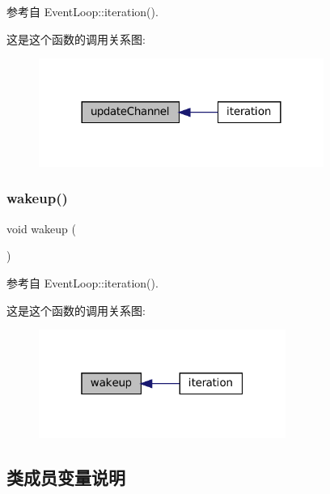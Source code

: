 参考自 Event\+Loop\+::iteration().

这是这个函数的调用关系图\+:
\nopagebreak
\begin{figure}[H]
\begin{center}
\leavevmode
\includegraphics[width=264pt]{classmuduo_1_1net_1_1EventLoop_acaa4a191936aacf608d279a6f343d533_icgraph}
\end{center}
\end{figure}
\mbox{\label{classmuduo_1_1net_1_1EventLoop_ae674290a26ecbd622c5160e38e8a4fe9}} 
\subsubsection{\texorpdfstring{wakeup()}{wakeup()}}
{\footnotesize\ttfamily void wakeup (\begin{DoxyParamCaption}{ }\end{DoxyParamCaption})}



参考自 Event\+Loop\+::iteration().

这是这个函数的调用关系图\+:
\nopagebreak
\begin{figure}[H]
\begin{center}
\leavevmode
\includegraphics[width=229pt]{classmuduo_1_1net_1_1EventLoop_ae674290a26ecbd622c5160e38e8a4fe9_icgraph}
\end{center}
\end{figure}


\subsection{类成员变量说明}
\mbox{\label{classmuduo_1_1net_1_1EventLoop_a9196549e63e60c1a0749ca09d7df6155}} 
